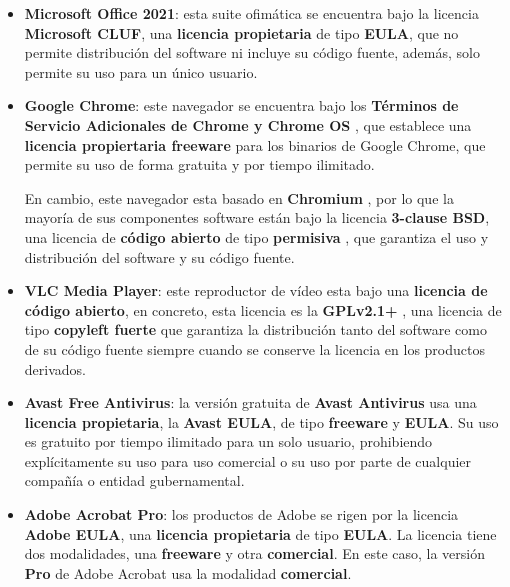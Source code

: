 \begin{itemize}
    \item \textbf{Microsoft Office 2021}: esta suite ofimática se encuentra bajo la licencia \textbf{Microsoft CLUF}, una \textbf{licencia propietaria} de tipo \textbf{EULA}, que no permite distribución del software ni incluye su código fuente, además, solo permite su uso para un único usuario. \cite{mscluf01}

    \item \textbf{Google Chrome}: este navegador se encuentra bajo los \textbf{Términos de Servicio Adicionales de Chrome y Chrome OS} \cite{wiki01}, que establece una \textbf{licencia propiertaria freeware} para los binarios de Google Chrome, que permite su uso de forma gratuita y por tiempo ilimitado.

     En cambio, este navegador esta basado en \textbf{Chromium} \cite{chrome01}, por lo que la mayoría de sus componentes software están bajo la licencia \textbf{3-clause BSD}, una licencia de \textbf{código abierto} de tipo \textbf{permisiva} \cite{wiki02}, que garantiza el uso y distribución del software y su código fuente.

     \item \textbf{VLC Media Player}: este reproductor de vídeo esta bajo una \textbf{licencia de código abierto}, en concreto, esta licencia es la \textbf{GPLv2.1+} \cite{vcl01}, una licencia de tipo \textbf{copyleft fuerte} que garantiza la distribución tanto del software como de su código fuente siempre cuando se conserve la licencia en los productos derivados.

     \item \textbf{Avast Free Antivirus}: la versión gratuita de \textbf{Avast Antivirus} usa una \textbf{licencia propietaria}, la \textbf{Avast EULA}, de tipo \textbf{freeware} y \textbf{EULA}. Su uso es gratuito por tiempo ilimitado para un solo usuario, prohibiendo explícitamente su uso para uso comercial o su uso por parte de cualquier compañía o entidad gubernamental. \cite{avas1}

     \item \textbf{Adobe Acrobat Pro}: los productos de Adobe se rigen por la licencia \textbf{Adobe EULA}, una \textbf{licencia propietaria} de tipo \textbf{EULA}. La licencia tiene dos modalidades, una \textbf{freeware} y otra \textbf{comercial}. En este caso, la versión \textbf{Pro} de Adobe Acrobat usa la modalidad \textbf{comercial}. \cite{adobe1}
\end{itemize}

